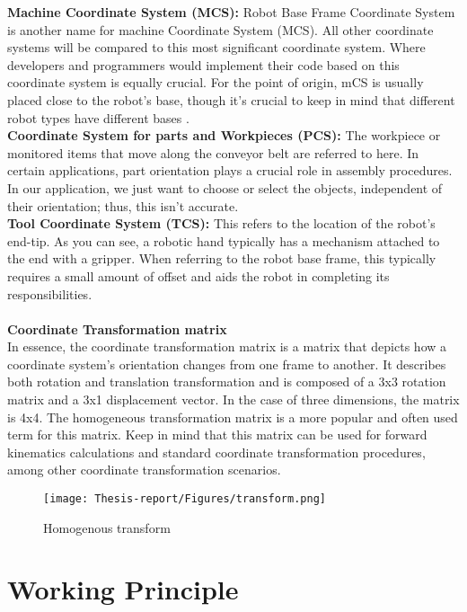 \documentclass[12pt]{article}
\begin{document}
 \textbf{Machine Coordinate System (MCS):}
Robot Base Frame Coordinate System is another name for machine Coordinate System (MCS). All other coordinate systems will be compared to this most significant coordinate system. Where developers and programmers would implement their code based on this coordinate system is equally crucial. For the point of origin, mCS is usually placed close to the robot's base, though it's crucial to keep in mind that different robot types have different bases \cite{ref24}.\\

 \textbf{Coordinate System for parts and Workpieces (PCS):}
The workpiece or monitored items that move along the conveyor belt are referred to here. In certain applications, part orientation plays a crucial role in assembly procedures. In our application, we just want to choose or select the objects, independent of their orientation; thus, this isn't accurate\cite{ref24}.\\

 \textbf{Tool Coordinate System (TCS):}
 This refers to the location of the robot's end-tip. As you can see, a robotic hand typically has a mechanism attached to the end with a gripper. When referring to the robot base frame, this typically requires a small amount of offset and aids the robot in completing its responsibilities\cite{ref24}.\\\\
 \textbf{ Coordinate Transformation matrix}  \\
 In essence, the coordinate transformation matrix is a matrix that depicts how a coordinate system's orientation changes from one frame to another. It describes both rotation and translation transformation and is composed of a 3x3 rotation matrix and a 3x1 displacement vector.  In the case of three dimensions, the matrix is 4x4.  The homogeneous transformation matrix is a more popular and often used term for this matrix.  Keep in mind that this matrix can be used for forward kinematics calculations and standard coordinate transformation procedures, among other coordinate transformation scenarios\cite{ref24}.

\begin{figure}[h]
    \centering
    \texttt{[image: Thesis-report/Figures/transform.png]} 
    \caption{Homogenous transform \cite{ref25}}
    \label{fig:Photoneo_Camera}
\end{figure}
\newpage
\section{Working Principle}
\end{document}
